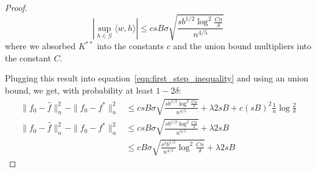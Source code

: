 \begin{proof}
\[
|\sup_{h \in \mathcal{G}} \langle w, h \rangle | \leq c sB \sigma \sqrt{ 
   \frac{s b^{1/2} \log^2 \frac{Cn}{\delta}}{n^{4/5}}}
\]
where we absorbed $K^{**}$ into the constants $c$ and the union bound multipliers into the constant $C$.








Plugging this result into equation~\ref{eqn:first_step_inequality} and using an union bound, we get, with probability at least $1 - 2\delta$:
\begin{align}
\|f_0 - \hat{f} \|_n^2 - \| f_0 - f^* \|_n^2 
   &\leq c sB \sigma \sqrt{ 
   \frac{s b^{1/2} \log^2 \frac{Cn}{\delta}}{n^{4/5}}}
   + \lambda 2 s B + c (sB)^2 \frac{1}{n} \log \frac{2}{\delta} \nonumber\\
\|f_0 - \hat{f} \|_n^2 - \| f_0 - f^* \|_n^2 
   &\leq c sB \sigma \sqrt{ 
   \frac{s b^{1/2} \log^2 \frac{Cn}{\delta}}{n^{4/5}}}
   + \lambda 2 s B \nonumber\\   
   &\leq c B \sigma 
    \sqrt{ \frac{s^3 b^{1/2}}{n^{4/5}} \log^2 \frac{Cn}{\delta}} + \lambda 2 sB
\label{eqn:second_step_inequality}
\end{align}


\end{proof}
